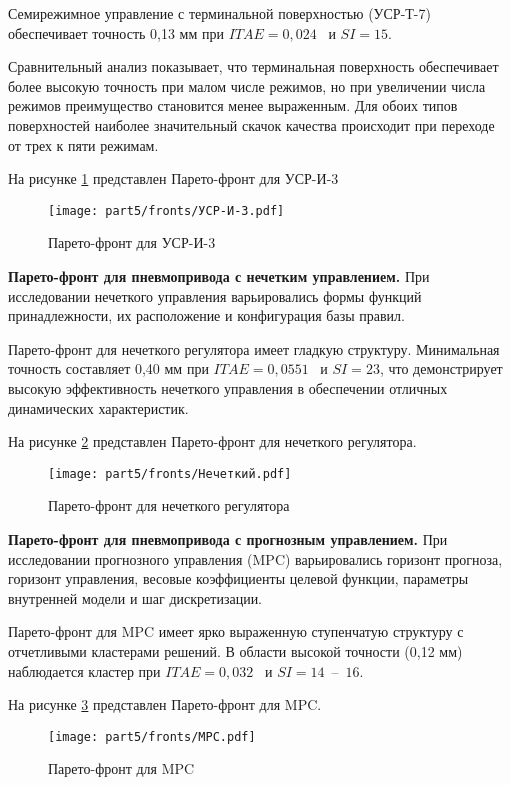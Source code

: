 Семирежимное управление с терминальной поверхностью (УСР-Т-7) обеспечивает
точность 0,13 мм при $ITAE = 0,024$ \si{\metre\per\second\square} и $SI = 15$.

Сравнительный анализ показывает, что терминальная поверхность обеспечивает более высокую точность
при малом числе режимов, но при увеличении числа режимов преимущество
становится менее выраженным. Для обоих типов поверхностей наиболее значительный скачок качества происходит при переходе от трех к пяти режимам.

На рисунке \ref{fig:scrolling_pareto} представлен Парето-фронт для УСР-И-3
\begin{figure}[h]
	\centering
	\texttt{[image: part5/fronts/УСР-И-3.pdf]}
	\caption{Парето-фронт для УСР-И-3}
	\label{fig:scrolling_pareto}
\end{figure}

\textbf{Парето-фронт для пневмопривода с нечетким управлением.}
При исследовании нечеткого управления варьировались формы
функций принадлежности, их расположение и конфигурация базы правил.

Парето-фронт для нечеткого регулятора имеет гладкую структуру.
Минимальная точность составляет 0,40 мм при $ITAE = 0,0551$ \si{\metre\per\second\square} и $SI = 23$,
что демонстрирует высокую эффективность нечеткого управления в обеспечении отличных динамических характеристик.

На рисунке \ref{fig:fuzzy_pareto} представлен Парето-фронт для нечеткого регулятора.
\begin{figure}[h]
	\centering
	\texttt{[image: part5/fronts/Нечеткий.pdf]}
	\caption{Парето-фронт для нечеткого регулятора}
	\label{fig:fuzzy_pareto}
\end{figure}

\textbf{Парето-фронт для пневмопривода с прогнозным управлением.}
При исследовании прогнозного управления (MPC) варьировались горизонт прогноза,
горизонт управления, весовые коэффициенты целевой функции, параметры внутренней модели и шаг дискретизации.

Парето-фронт для MPC имеет ярко выраженную ступенчатую структуру с отчетливыми
кластерами решений. В области высокой точности (0,12 мм) наблюдается кластер
при $ITAE = 0,032$ \si{\metre\per\second\square} и $SI = 14$~--~$16$.

На рисунке \ref{fig:mpc_pareto} представлен Парето-фронт для MPC.
\begin{figure}[h]
	\centering
	\texttt{[image: part5/fronts/MPC.pdf]}
	\caption{Парето-фронт для MPC}
	\label{fig:mpc_pareto}
\end{figure}

